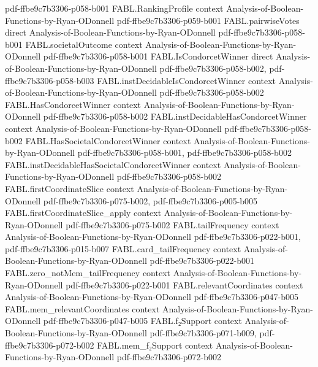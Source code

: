 \begin{theorem}
  {pdf-ffbe9c7b3306-p058-b001}
\proofstep
  {FABL.RankingProfile}
  {context}
  {Analysis-of-Boolean-Functions-by-Ryan-ODonnell}
  {pdf-ffbe9c7b3306-p059-b001}
\proofstep
  {FABL.pairwiseVotes}
  {direct}
  {Analysis-of-Boolean-Functions-by-Ryan-ODonnell}
  {pdf-ffbe9c7b3306-p058-b001}
\proofstep
  {FABL.societalOutcome}
  {context}
  {Analysis-of-Boolean-Functions-by-Ryan-ODonnell}
  {pdf-ffbe9c7b3306-p058-b001}
\proofstep
  {FABL.IsCondorcetWinner}
  {direct}
  {Analysis-of-Boolean-Functions-by-Ryan-ODonnell}
  {pdf-ffbe9c7b3306-p058-b002,
    pdf-ffbe9c7b3306-p058-b003}
\proofstep
  {FABL.instDecidableIsCondorcetWinner}
  {context}
  {Analysis-of-Boolean-Functions-by-Ryan-ODonnell}
  {pdf-ffbe9c7b3306-p058-b002}
\proofstep
  {FABL.HasCondorcetWinner}
  {context}
  {Analysis-of-Boolean-Functions-by-Ryan-ODonnell}
  {pdf-ffbe9c7b3306-p058-b002}
\proofstep
  {FABL.instDecidableHasCondorcetWinner}
  {context}
  {Analysis-of-Boolean-Functions-by-Ryan-ODonnell}
  {pdf-ffbe9c7b3306-p058-b002}
\proofstep
  {FABL.HasSocietalCondorcetWinner}
  {context}
  {Analysis-of-Boolean-Functions-by-Ryan-ODonnell}
  {pdf-ffbe9c7b3306-p058-b001,
    pdf-ffbe9c7b3306-p058-b002}
\proofstep
  {FABL.instDecidableHasSocietalCondorcetWinner}
  {context}
  {Analysis-of-Boolean-Functions-by-Ryan-ODonnell}
  {pdf-ffbe9c7b3306-p058-b002}
\proofstep
  {FABL.firstCoordinateSlice}
  {context}
  {Analysis-of-Boolean-Functions-by-Ryan-ODonnell}
  {pdf-ffbe9c7b3306-p075-b002,
    pdf-ffbe9c7b3306-p005-b005}
\proofstep
  {FABL.firstCoordinateSlice_apply}
  {context}
  {Analysis-of-Boolean-Functions-by-Ryan-ODonnell}
  {pdf-ffbe9c7b3306-p075-b002}
\proofstep
  {FABL.tailFrequency}
  {context}
  {Analysis-of-Boolean-Functions-by-Ryan-ODonnell}
  {pdf-ffbe9c7b3306-p022-b001,
    pdf-ffbe9c7b3306-p015-b007}
\proofstep
  {FABL.card_tailFrequency}
  {context}
  {Analysis-of-Boolean-Functions-by-Ryan-ODonnell}
  {pdf-ffbe9c7b3306-p022-b001}
\proofstep
  {FABL.zero_notMem_tailFrequency}
  {context}
  {Analysis-of-Boolean-Functions-by-Ryan-ODonnell}
  {pdf-ffbe9c7b3306-p022-b001}
\proofstep
  {FABL.relevantCoordinates}
  {context}
  {Analysis-of-Boolean-Functions-by-Ryan-ODonnell}
  {pdf-ffbe9c7b3306-p047-b005}
\proofstep
  {FABL.mem_relevantCoordinates}
  {context}
  {Analysis-of-Boolean-Functions-by-Ryan-ODonnell}
  {pdf-ffbe9c7b3306-p047-b005}
\proofstep
  {FABL.f₂Support}
  {context}
  {Analysis-of-Boolean-Functions-by-Ryan-ODonnell}
  {pdf-ffbe9c7b3306-p071-b009,
    pdf-ffbe9c7b3306-p072-b002}
\proofstep
  {FABL.mem_f₂Support}
  {context}
  {Analysis-of-Boolean-Functions-by-Ryan-ODonnell}
  {pdf-ffbe9c7b3306-p072-b002}

\end{theorem}
